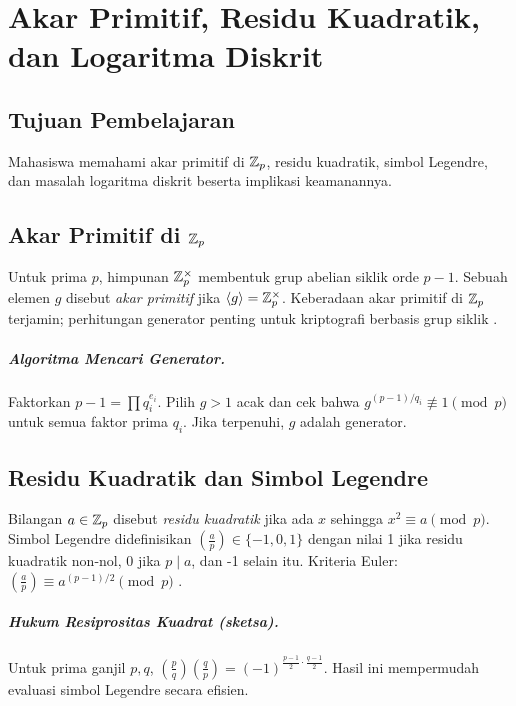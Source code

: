 \documentclass[../main.tex]{subfiles}
\begin{document}
\chapter{Akar Primitif, Residu Kuadratik, dan Logaritma Diskrit}

\section{Tujuan Pembelajaran}
Mahasiswa memahami akar primitif di \(\mathbb{Z}_p\), residu kuadratik, simbol Legendre, dan masalah logaritma diskrit beserta implikasi keamanannya.

\section{Akar Primitif di \(\mathbb{Z}_p\)}
Untuk prima \(p\), himpunan \(\mathbb{Z}_p^\times\) membentuk grup abelian siklik orde \(p-1\). Sebuah elemen \(g\) disebut \emph{akar primitif} jika \(\langle g\rangle = \mathbb{Z}_p^\times\). Keberadaan akar primitif di \(\mathbb{Z}_p\) terjamin; perhitungan generator penting untuk kriptografi berbasis grup siklik \citep{hoffstein}.

\paragraph{Algoritma Mencari Generator.} Faktorkan \(p-1=\prod q_i^{e_i}\). Pilih \(g>1\) acak dan cek bahwa \(g^{(p-1)/q_i}\not\equiv 1\pmod p\) untuk semua faktor prima \(q_i\). Jika terpenuhi, \(g\) adalah generator.

\section{Residu Kuadratik dan Simbol Legendre}
Bilangan \(a\in\mathbb{Z}_p\) disebut \emph{residu kuadratik} jika ada \(x\) sehingga \(x^2\equiv a\pmod p\). Simbol Legendre didefinisikan \(\left(\tfrac{a}{p}\right)\in\{-1,0,1\}\) dengan nilai 1 jika residu kuadratik non-nol, 0 jika \(p\mid a\), dan -1 selain itu. Kriteria Euler: \(\left(\tfrac{a}{p}\right)\equiv a^{(p-1)/2}\pmod p\) \citep{hoffstein}.

\paragraph{Hukum Resiprositas Kuadrat (sketsa).} Untuk prima ganjil \(p,q\), \(\left(\tfrac{p}{q}\right)\left(\tfrac{q}{p}\right)=(-1)^{\frac{p-1}{2}\cdot\frac{q-1}{2}}\). Hasil ini mempermudah evaluasi simbol Legendre secara efisien.
\end{document}

